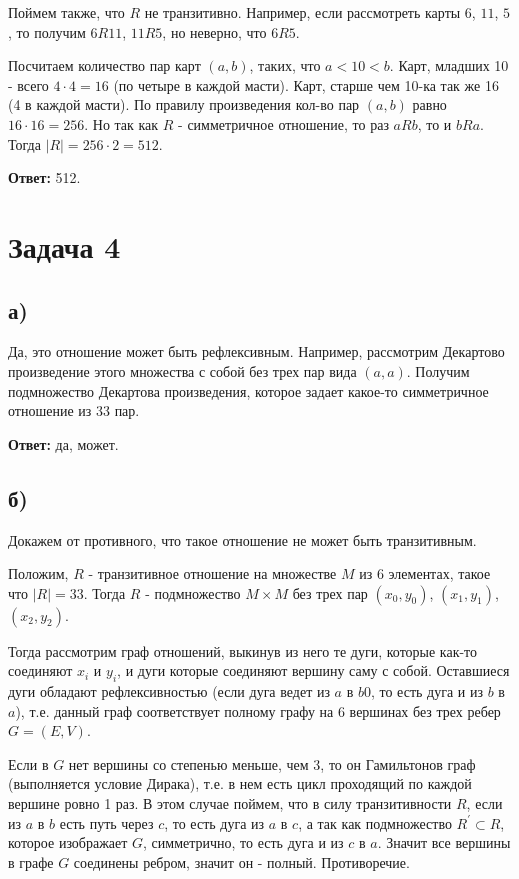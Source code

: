 \documentclass{article}
\begin{document}
	Поймем также, что $R$ не транзитивно. Например, если рассмотреть карты $6$, $11$, $5$, то получим $6 R 11$, $11 R 5$, но неверно, что $6 R 5$. 
	
	Посчитаем количество пар карт $(a, b)$, таких, что $a < 10 < b$. Карт, младших 10 - всего $4 \cdot 4 = 16$ (по четыре в каждой масти). Карт, старше чем 10-ка так же 16 (4 в каждой масти). По правилу произведения кол-во пар $(a, b)$ равно $16 \cdot 16 = 256$. Но так как $R$ - симметричное отношение, то раз $a R b$, то и $b R a$. Тогда $|R| = 256 \cdot 2 = 512$.
	
	\textbf{Ответ:} 512.
	
	\section{Задача 4}
	
	\subsection {а)} 
	Да, это отношение может быть рефлексивным. Например, рассмотрим Декартово произведение этого множества с собой без трех пар вида $(a, a)$. Получим подмножество Декартова произведения, которое задает какое-то симметричное отношение из 33 пар.
	
	\textbf{Ответ:} да, может.

	\subsection{б)}
	Докажем от противного, что такое отношение не может быть транзитивным. 
	
	Положим, $R$ - транзитивное отношение на множестве $M$ из 6 элементах, такое что $|R| = 33$. Тогда $R$ - подмножество $M \times M$ без трех пар $(x_0, y_0)$, $(x_1, y_1)$, $(x_2, y_2)$. 
	
	Тогда рассмотрим граф отношений, выкинув из него те дуги, которые как-то соединяют $x_i$ и $y_i$, и дуги которые соединяют вершину саму с собой. Оставшиеся дуги обладают рефлексивностью (если дуга ведет из $a$ в $b0$, то есть дуга и из $b$ в $a$), т.е. данный граф соответствует полному графу на 6 вершинах без трех ребер  $G = (E, V)$.
	
	Если в $G$ нет вершины со степенью меньше, чем $3$, то он Гамильтонов граф (выполняется условие Дирака), т.е. в нем есть цикл проходящий по каждой вершине ровно 1 раз. В этом случае поймем, что в силу транзитивности $R$, если из $a$ в $b$ есть путь через $c$, то есть дуга из $a$ в $c$, а так как подмножество  $R^{\prime} \subset R$, которое изображает $G$, симметрично, то есть дуга и из $c$ в $a$. Значит все вершины в графе $G$ соединены ребром, значит он - полный. Противоречие.
	
\end{document}
